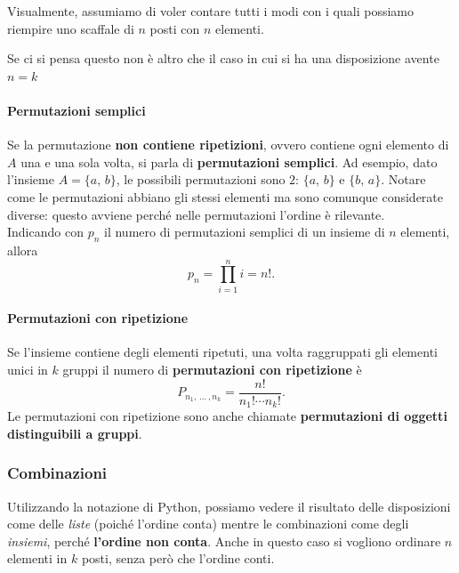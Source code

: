 \noindent Visualmente, assumiamo di voler contare tutti i modi con i quali possiamo riempire uno scaffale di $n$ posti con $n$ elementi.

\begin{figure}[h]
\vspace{\abovedisplayskip}
\centering
{}
\end{figure}

Se ci si pensa questo non è altro che il caso in cui si ha una disposizione avente $n = k$

\paragraph{Permutazioni semplici}
Se la permutazione \textbf{non contiene ripetizioni}, ovvero contiene ogni elemento di $A$ una e una sola volta, si parla di \textbf{permutazioni semplici}. Ad esempio, dato l'insieme $A = \{a, \, b\}$, le possibili permutazioni sono $2$: $\{a, \, b\}$ e $\{b, \, a\}$. Notare come le permutazioni abbiano gli stessi elementi ma sono comunque considerate diverse: questo avviene perché nelle permutazioni l'ordine è rilevante. \\
Indicando con $p_n$ il numero di permutazioni semplici di un insieme di $n$ elementi, allora \[ 
\boxed{p_n = \prod_{i=1}^n i = n!}.
\]
\paragraph{Permutazioni con ripetizione}
Se l'insieme contiene degli elementi ripetuti, una volta raggruppati gli elementi unici in $k$ gruppi il numero di \textbf{permutazioni con ripetizione} è \[
\boxed{
    P_{n_1, \, \dots \, , n_k} =
    \frac{n!}{n_1! \cdots n_k!}
}.
\]
Le permutazioni con ripetizione sono anche chiamate \textbf{permutazioni di oggetti distinguibili a gruppi}.

\subsubsection{Combinazioni}
Utilizzando la notazione di Python, possiamo vedere il risultato delle disposizioni come delle \textit{liste} (poiché l'ordine conta) mentre le combinazioni come degli \textit{insiemi}, perché \textbf{l'ordine non conta}.
Anche in questo caso si vogliono ordinare $n$ elementi in $k$ posti, senza però che l'ordine conti.

